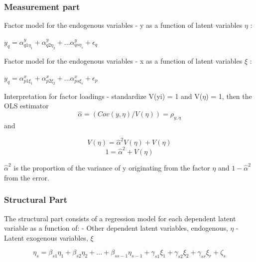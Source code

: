 \documentclass[12pt,a4paper,]{article}
\begin{document}
\hypertarget{measurement-part}{%
\subsubsection{Measurement part}\label{measurement-part}}

Factor model for the endogenous variables - y as a function of latent
variables \(\eta\) :

\(y_q = \alpha^{y}_{q1 \eta_{1}} + \alpha^{y}_{q2 \eta_{2}} + ... \alpha^{y}_{qs \eta_{s}} + \epsilon_{q}\)

Factor model for the endogenous variables - x as a function of latent
variables \(\xi\) :

\(y_q = \alpha^{x}_{p1 \xi_{1}} + \alpha^{x}_{p2 \xi_{2}} + ... \alpha^{x}_{ps \xi_{s}} + \epsilon_{p}\)

Interpretation for factor loadings - standardize V(yi) = 1 and
V(\(\eta\)) = 1, then the OLS estimator \begin{equation}
\hat{\alpha} = (Cov(y, \eta)/V(\eta)) = \rho_{y, \eta}
\end{equation} and

\begin{equation}
V(\eta) = \hat{\alpha}^2 V(\eta) + V(\eta)
\end{equation} \begin{equation}
1 = \hat{\alpha}^2 + V(\eta)
\end{equation}

\(\hat{\alpha}^2\) is the proportion of the variance of y originating
from the factor \(\eta\) and \(1-\hat{\alpha}^2\) from the error.

\hypertarget{structural-part}{%
\subsubsection{Structural Part}\label{structural-part}}

The structural part consists of a regression model for each dependent
latent variable as a function of: - Other dependent latent variables,
endogenous, \(\eta\) - Latent exogenous variables, \(\xi\)

\begin{equation}
\eta_{s} = \beta_{s1}\eta_{1} + \beta_{s2}\eta_{2} + ... + \beta_{ss-1}\eta_{s-1} + \gamma_{s1}\xi_{1} + \gamma_{s2}\xi_{2} + \gamma_{sr}\xi_{r} + \zeta_{s}
\end{equation}
\end{document}
